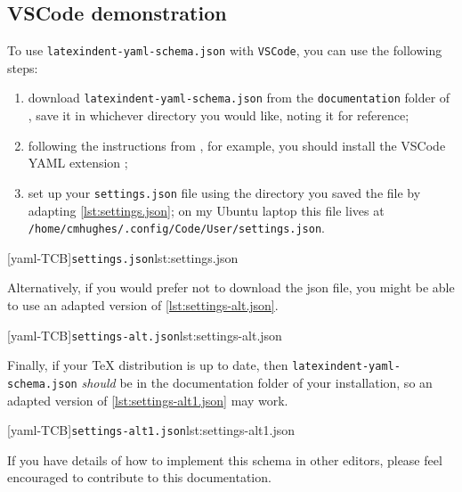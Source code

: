 	\subsection{VSCode demonstration}
		To use \texttt{latexindent-yaml-schema.json} with \texttt{VSCode}, you can use the
		following steps:  
		\begin{enumerate}
			\item download \texttt{latexindent-yaml-schema.json} from the \texttt{documentation} folder of
			      \cite{latexindent-home}, save it in whichever directory you would like, noting it for
			      reference;
			\item following the instructions from \cite{vscode-yaml-demo}, for example, you should install
			      the VSCode YAML extension \cite{vscode-yaml-extentions};
			\item set up your \texttt{settings.json} file using the directory you saved the file by
			      adapting \cref{lst:settings.json}; on my Ubuntu laptop this file lives at
			      \texttt{/home/cmhughes/.config/Code/User/settings.json}.
		\end{enumerate}

		\begin{widepage}
			[yaml-TCB]{\texttt{settings.json}}{lst:settings.json}
		\end{widepage}

		Alternatively, if you would prefer not to download the json file, you might be able to
		use an adapted version of \cref{lst:settings-alt.json}.

		\begin{widepage}
			[yaml-TCB]{\texttt{settings-alt.json}}{lst:settings-alt.json}
		\end{widepage}

		Finally, if your TeX distribution is up to date, then
		\texttt{latexindent-yaml-schema.json} \emph{should} be in the documentation folder of
		your installation, so an adapted version of \cref{lst:settings-alt1.json} may work.

		\begin{widepage}
			[yaml-TCB]{\texttt{settings-alt1.json}}{lst:settings-alt1.json}
		\end{widepage}

		If you have details of how to implement this schema in other editors, please feel
		encouraged to contribute to this documentation.

